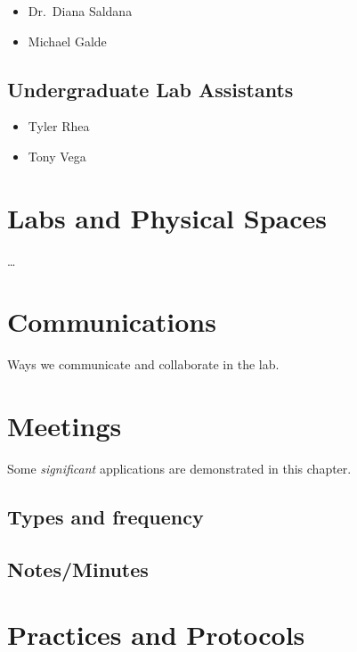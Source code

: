 \documentclass[
]{book}
\providecommand{\tightlist}{%
  \setlength{\itemsep}{0pt}\setlength{\parskip}{0pt}}
\begin{document}
\begin{itemize}
\tightlist
\item
  Dr.~Diana Saldana
\item
  Michael Galde
\end{itemize}

\hypertarget{undergraduate-lab-assistants}{%
\section{Undergraduate Lab Assistants}\label{undergraduate-lab-assistants}}

\begin{itemize}
\tightlist
\item
  Tyler Rhea
\item
  Tony Vega
\end{itemize}

\hypertarget{spaces}{%
\chapter{Labs and Physical Spaces}\label{spaces}}

\ldots{}

\hypertarget{comms}{%
\chapter{Communications}\label{comms}}

Ways we communicate and collaborate in the lab.

\hypertarget{meetings}{%
\chapter{Meetings}\label{meetings}}

Some \emph{significant} applications are demonstrated in this chapter.

\hypertarget{types-and-frequency}{%
\section{Types and frequency}\label{types-and-frequency}}

\hypertarget{notesminutes}{%
\section{Notes/Minutes}\label{notesminutes}}

\hypertarget{protocols}{%
\chapter{Practices and Protocols}\label{protocols}}
\end{document}
